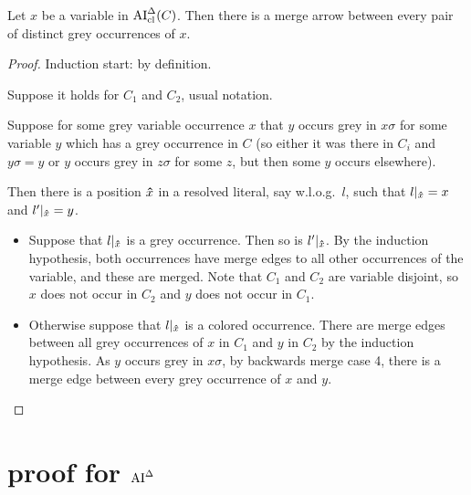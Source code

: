 \documentclass[,%
	paper=a4,%
	DIV9, %
	twoside=false,%
	liststotoc,
	bibtotoc,
	draft=false,%
	numbers=noendperiod
]{scrartcl}
\begin{document}
\begin{lemma}
	\label{lemma:arrow_from_grey_to_grey}
	Let $x$ be a variable in $\operatorname{AI}_\mathrm{cl}^\Delta(C)$.
	Then there is a merge arrow between every pair of distinct grey occurrences of $x$.
\end{lemma}
\begin{proof}
	Induction start: by definition.

	Suppose it holds for $C_1$ and $C_2$, usual notation.

	Suppose for some grey variable occurrence $x$ that $y$ occurs grey in $x\sigma$ for some variable $y$ which has a grey occurrence in $C$ (so either it was there in $C_i$ and $y\sigma = y$ or $y$ occurs grey in $z\sigma$ for some $z$, but then some $y$ occurs elsewhere). 

	Then there is a position $\bm\hat x$ in a resolved literal, say w.l.o.g.\ $l$, such that $l|_{\bm\hat x} = x$ and $l'|_{\bm\hat x} = y$.

	\begin{itemize}
		\item
			Suppose that $l|_{\bm\hat x}$ is a grey occurrence.
			Then so is $l'|_{\bm\hat x}$.
			By the induction hypothesis, both occurrences have merge edges to all other occurrences of the variable, and these are merged.
			Note that $C_1$ and $C_2$ are variable disjoint, so $x$ does not occur in $C_2$ and $y$ does not occur in $C_1$.

		\item
			Otherwise suppose that $l|_{\bm\hat x}$ is a colored occurrence.
			There are merge edges between all grey occurrences of $x$ in $C_1$ and $y$ in $C_2$ by the induction hypothesis.
			As $y$ occurs grey in $x\sigma$, by backwards merge case 4, there is a merge edge between every grey occurrence of $x$ and $y$.
			\qedhere
	\end{itemize}

\end{proof}

\section{proof for $\operatorname{AI}^\Delta$}
\end{document}
